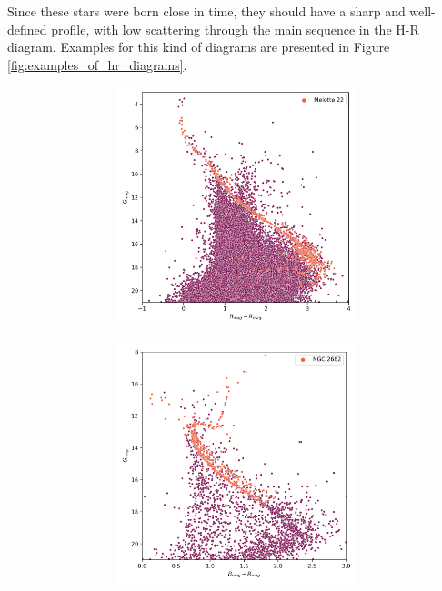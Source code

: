 \documentclass[11pt, a4paper, english]{book}
\begin{document}
Since these stars were born close in time, they should have a sharp and well-defined profile,
with low scattering through the main sequence in the H-R diagram.
Examples for this kind of diagrams are presented in Figure \ref{fig:examples_of_hr_diagrams}.

\begin{figure}[htbp]
  \centering
  \begin{subfigure}{0.9\textwidth}
    \centering
    \begin{subfigure}[t]{0.45\textwidth}
      \centering
      \includegraphics[width=\textwidth]{../figures/melotte_22/hr_diagram_melotte_22.png}
    \end{subfigure}
    \hfill
    \begin{subfigure}[t]{0.45\textwidth}
      \centering
      \includegraphics[width=\textwidth]{../figures/ngc_2682/hr_diagram_ngc_2682.png}

\end{subfigure}
\end{subfigure}
\end{figure}
\end{document}
